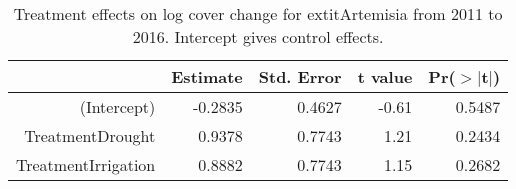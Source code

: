 \begin{table}[ht]
\centering
\caption{Treatment effects on log cover change for 	extit{Artemisia} from 2011 to 2016. Intercept gives control effects.} 
\label{table:changeARTR}
\begin{tabular}{rrrrr}
  \hline
 & Estimate & Std. Error & t value & Pr($>$$|$t$|$) \\ 
  \hline
(Intercept) & -0.2835 & 0.4627 & -0.61 & 0.5487 \\ 
  TreatmentDrought & 0.9378 & 0.7743 & 1.21 & 0.2434 \\ 
  TreatmentIrrigation & 0.8882 & 0.7743 & 1.15 & 0.2682 \\ 
   \hline
\end{tabular}
\end{table}

